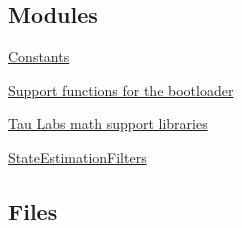 \subsection*{\-Modules}
\begin{DoxyCompactItemize}
\item 
\hyperlink{group___constants}{\-Constants}
\item 
\hyperlink{group___bootloader_support}{\-Support functions for the bootloader}
\item 
\hyperlink{group___tau_labs_math}{\-Tau Labs math support libraries}
\item 
\hyperlink{group___state_estimation_filters}{\-State\-Estimation\-Filters}
\end{DoxyCompactItemize}
\subsection*{\-Files}
